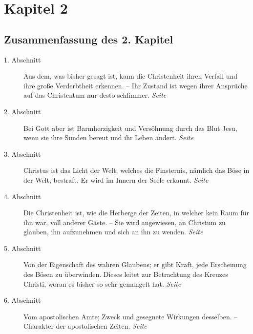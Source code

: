 
\chapter{Kapitel 2} \label{kap2}


\section{Zusammenfassung des 2. Kapitel}

\begin{description}
\item[1. Abschnitt] Aus dem, was bisher gesagt ist, kann die Christenheit ihren
Verfall und ihre große Verderbtheit erkennen. -- Ihr Zustand ist wegen ihrer
Ansprüche auf das Christentum
 nur desto schlimmer.
\dotfill \textit{Seite~\pageref{kap2_ab1}}\\

\item[2. Abschnitt] Bei Gott aber ist Barmherzigkeit und Versöhnung durch das
Blut Jesu, wenn sie ihre Sünden bereut und ihr Leben ändert.
\dotfill \textit{Seite~\pageref{kap2_ab2}}\\

\item[3. Abschnitt] Christus ist das Licht der Welt, welches die Finsternis,
nämlich das Böse in der Welt, bestraft. Er wird im Innern der Seele erkannt.
\dotfill \textit{Seite~\pageref{kap2_ab3}}\\

\item[4. Abschnitt] Die Christenheit ist, wie die Herberge der Zeiten, in
welcher kein Raum für ihn war, voll anderer Gäste. -- Sie wird angewiesen, an
Christum zu glauben, ihn aufzunehmen und sich an ihn zu wenden.
\dotfill \textit{Seite~\pageref{kap2_ab4}}\\

\item[5. Abschnitt] Von der Eigenschaft des wahren Glaubens; er gibt Kraft,
jede Erscheinung des Bösen zu überwinden. Dieses leitet%
 zur Betrachtung des
Kreuzes Christi, woran es bisher so sehr gemangelt hat.
\dotfill \textit{Seite~\pageref{kap2_ab5}}\\

\item[6. Abschnitt] Vom apostolischen Amte; Zweck und gesegnete Wirkungen
desselben. -- Charakter der apostolischen Zeiten.
\dotfill \textit{Seite~\pageref{kap2_ab6}}\\


\end{description}
